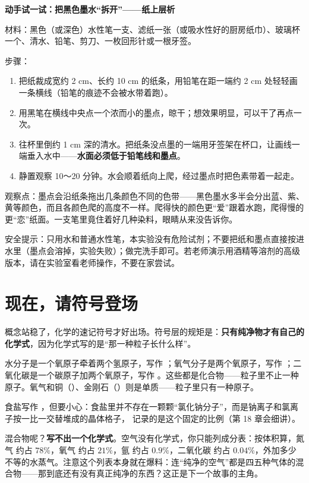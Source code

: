 \begin{shiyan}
\textbf{动手试一试：把黑色墨水“拆开”——纸上层析}

材料：黑色（或深色）水性笔一支、滤纸一张（或吸水性好的厨房纸巾）、玻璃杯一个、清水、铅笔、剪刀、一枚回形针或一根牙签。

步骤：
\begin{enumerate}[itemsep=1pt]
\item 把纸裁成宽约 2 cm、长约 10 cm 的纸条，用铅笔在距一端约 2 cm 处轻轻画一条横线（铅笔的痕迹不会被水带着跑）。
\item 用黑笔在横线中央点一个浓而小的墨点，晾干；想效果明显，可以干了再点一次。
\item 往杯里倒约 1 cm 深的清水。把纸条没点墨的一端用牙签架在杯口，让画线一端垂入水中——\textbf{水面必须低于铅笔线和墨点}。
\item 静置观察 10～20 分钟。水会顺着纸向上爬，经过墨点时把色素带着一起走。
\end{enumerate}

观察点：墨点会沿纸条拖出几条颜色不同的色带——黑色墨水多半会分出蓝、紫、黄等颜色，而且各颜色爬的高度不一样。爬得快的颜色更“爱”跟着水跑，爬得慢的更“恋”纸面。一支笔里竟住着好几种染料，眼睛从来没告诉你。

安全提示：只用水和普通水性笔，本实验没有危险试剂；不要把纸和墨点直接按进水里（墨点会溶掉，实验失败）；做完洗手即可。若老师演示用酒精等溶剂的高级版本，请在实验室看老师操作，不要在家尝试。
\end{shiyan}

\section{现在，请符号登场}

概念站稳了，化学的速记符号才好出场。符号层的规矩是：\textbf{只有纯净物才有自己的化学式}，因为化学式写的是“那一种粒子长什么样”。

水分子是一个氧原子牵着两个氢原子，写作 ；氧气分子是两个氧原子，写作 ；二氧化碳是一个碳原子加两个氧原子，写作 。这些都是化合物——粒子里不止一种原子。氧气和铜（）、金刚石（）则是单质——粒子里只有一种原子。

食盐写作 ，但要小心：食盐里并不存在一颗颗“氯化钠分子”，而是钠离子和氯离子按一比一交替堆成的晶体格子， 记录的是这个固定的比例（第 18 章会细讲）。

混合物呢？\textbf{写不出一个化学式}。空气没有化学式，你只能列成分表：按体积算，氮气  约占 $78\%$，氧气  约占 $21\%$，氩  约占 $0.9\%$，二氧化碳  约占 $0.04\%$，外加多少不等的水蒸气。注意这个列表本身就在爆料：连“纯净的空气”都是四五种气体的混合物——那到底还有没有真正纯净的东西？这正是下一个故事的主角。

